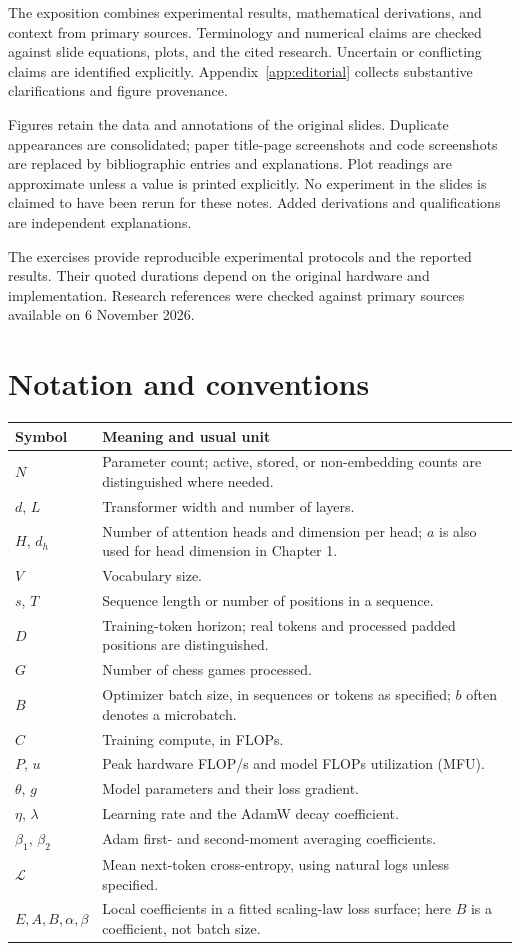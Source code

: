\documentclass[11pt,a4paper,oneside]{report}
\newcommand{\loss}{\mathcal L}
\begin{document}
The exposition combines experimental results, mathematical derivations, and context from primary sources. Terminology and numerical claims are checked against slide equations, plots, and the cited research. Uncertain or conflicting claims are identified explicitly. Appendix~\ref{app:editorial} collects substantive clarifications and figure provenance.

Figures retain the data and annotations of the original slides. Duplicate appearances are consolidated; paper title-page screenshots and code screenshots are replaced by bibliographic entries and explanations. Plot readings are approximate unless a value is printed explicitly. No experiment in the slides is claimed to have been rerun for these notes. Added derivations and qualifications are independent explanations.

The exercises provide reproducible experimental protocols and the reported results. Their quoted durations depend on the original hardware and implementation. Research references were checked against primary sources available on 6 November 2026.

\chapter*{Notation and conventions}
\begin{tabularx}{\linewidth}{lX}
\toprule
Symbol&Meaning and usual unit\\
\midrule
$N$&Parameter count; active, stored, or non-embedding counts are distinguished where needed.\\
$d$, $L$&Transformer width and number of layers.\\
$H$, $d_h$&Number of attention heads and dimension per head; $a$ is also used for head dimension in Chapter 1.\\
$V$&Vocabulary size.\\
$s$, $T$&Sequence length or number of positions in a sequence.\\
$D$&Training-token horizon; real tokens and processed padded positions are distinguished.\\
$G$&Number of chess games processed.\\
$B$&Optimizer batch size, in sequences or tokens as specified; $b$ often denotes a microbatch.\\
$C$&Training compute, in FLOPs.\\
$P$, $u$&Peak hardware FLOP/s and model FLOPs utilization (MFU).\\
$\theta$, $g$&Model parameters and their loss gradient.\\
$\eta$, $\lambda$&Learning rate and the AdamW decay coefficient.\\
$\beta_1$, $\beta_2$&Adam first- and second-moment averaging coefficients.\\
$\loss$&Mean next-token cross-entropy, using natural logs unless specified.\\
$E,A,B,\alpha,\beta$&Local coefficients in a fitted scaling-law loss surface; here $B$ is a coefficient, not batch size.\\
\bottomrule
\end{tabularx}
\end{document}
